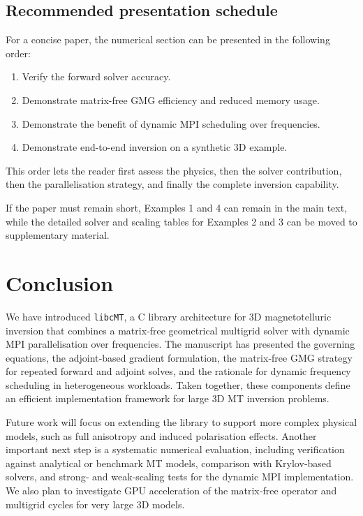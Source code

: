 \documentclass{article}
\begin{document}
\subsection{Recommended presentation schedule}

For a concise paper, the numerical section can be presented in the following order:
\begin{enumerate}
  \item Verify the forward solver accuracy.
  \item Demonstrate matrix-free GMG efficiency and reduced memory usage.
  \item Demonstrate the benefit of dynamic MPI scheduling over frequencies.
  \item Demonstrate end-to-end inversion on a synthetic 3D example.
\end{enumerate}
This order lets the reader first assess the physics, then the solver contribution, then the parallelisation strategy, and finally the complete inversion capability.

If the paper must remain short, Examples 1 and 4 can remain in the main text, while the detailed solver and scaling tables for Examples 2 and 3 can be moved to supplementary material.


\section{Conclusion}

We have introduced \texttt{libcMT}, a C library architecture for 3D magnetotelluric inversion that combines a matrix‑free geometrical multigrid solver with dynamic MPI parallelisation over frequencies. The manuscript has presented the governing equations, the adjoint‑based gradient formulation, the matrix‑free GMG strategy for repeated forward and adjoint solves, and the rationale for dynamic frequency scheduling in heterogeneous workloads. Taken together, these components define an efficient implementation framework for large 3D MT inversion problems.

Future work will focus on extending the library to support more complex physical models, such as full anisotropy and induced polarisation effects. Another important next step is a systematic numerical evaluation, including verification against analytical or benchmark MT models, comparison with Krylov‑based solvers, and strong‑ and weak‑scaling tests for the dynamic MPI implementation. We also plan to investigate GPU acceleration of the matrix‑free operator and multigrid cycles for very large 3D models.



\end{document}
